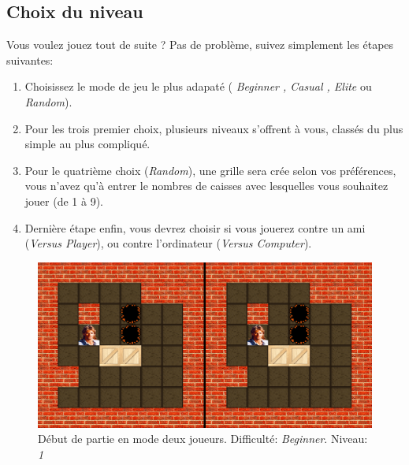 \documentclass[a4paper,12pt]{article}
\begin{document}
\subsection{Choix du niveau}

Vous voulez jouez tout de suite ? Pas de problème, suivez simplement les étapes suivantes:
\begin{enumerate}
    \item Choisissez le mode de jeu le plus adapaté ( \textit{Beginner , Casual , Elite} ou \textit{Random}).
    \item Pour les trois premier choix, plusieurs niveaux s'offrent à vous, classés du plus simple au plus compliqué.
    \item Pour le quatrième choix (\textit{Random}), une grille sera crée selon vos préférences, vous n'avez qu'à entrer le nombres de caisses avec lesquelles vous souhaitez jouer (de 1 à 9).
    \item Dernière étape enfin, vous devrez choisir si vous jouerez contre un ami (\textit{Versus Player}), ou contre l'ordinateur (\textit{Versus Computer}).
\end{enumerate}
\begin{figure}[H]
\begin{center}
\includegraphics[scale=0.4]{./Illustrations/splitscreen.png}
\caption{Début de partie en mode deux joueurs. Difficulté: \textit{Beginner}. Niveau: \it1}
\end{center}
\end{figure}
\end{document}

